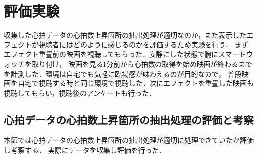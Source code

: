 \thispagestyle{myheadings}
\chapter{評価実験}

収集した心拍データの心拍数上昇箇所の抽出処理が適切なのか，また表示したエフェクトが視聴者にはどのように感じるのかを評価するため実験を行う．
まずエフェクト重畳前の映画を視聴してもらった．安静にした状態で腕にスマートウォッチを取り付け，
映画を見る1分前から心拍数の取得を始め映画が終わるまでを計測した．環境は自宅でも気軽に臨場感が味わえるのが目的なので，
普段映画を自宅で視聴する時と同じ環境で視聴した．次にエフェクトを重畳した映画も視聴してもらい，視聴後のアンケートも行った．

\section{心拍データの心拍数上昇箇所の抽出処理の評価と考察}
本節では心拍データの心拍数上昇箇所の抽出処理が適切に処理できていたか評価し考察する．
実際にデータを収集し評価を行った．

